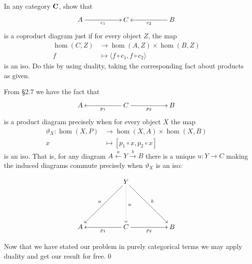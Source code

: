 \setcounter{booksection}{3}
\clearpage
\begin{BookProblem}{1}
  In any category \(\mathbf{{C}}\), show that 
  \[\xymatrix{A\ar[rr]_{c_1}&&C&&B\ar[ll]^{c_2}}\]
  is a coproduct diagram just if for every object \(Z\), the map 
  \begin{align*}
    \hom(C,Z) &\to \hom(A,Z) \times \hom(B,Z)\\
    f &\mapsto \langle f \circ c_1, f \circ c_2 \rangle
  \end{align*}
  is an iso. Do this by using duality, taking the corresponding fact about
  products as given.

  \begin{Solution}
    From \S2.7 we have the fact that 
    \[\xymatrix{A\ar@{<-}[rr]_{p_1}&&C&&B\ar@{<-}[ll]^{p_2}}\]
    is a product diagram precisely when for every object \(X\) the map
    \begin{align}
      \vartheta_X: \hom(X,P) &\to     \hom(X, A) \times \hom(X, B)\label{eq}\\
                   x         &\mapsto [p_1\circ x, p_2 \circ x]\nonumber
    \end{align}
    is an iso. That is, for any diagram \(A \xleftarrow{a} Y\xrightarrow{b} B\)
    there is a unique \(u: Y \to C\) making the induced diagrams commute
    precisely when \(\vartheta_X\) is an iso:

    \[\xymatrix{
      && Y\ar[ddll]_a\ar[ddrr]^b\ar@{..>}[dd]^u\\
      &&&&\\
      A\ar@{<-}[rr]_{p_1}&&C&&B\ar@{<-}[ll]^{p_2}
    }\]
    
    Now that we have stated our problem in purely categorical terms we may apply
    duality and get our result for free.\qed{}
  \end{Solution}
\end{BookProblem}

